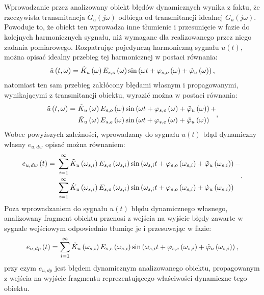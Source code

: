 Wprowadzanie przez analizowany obiekt błędów dynamicznych wynika z faktu, że rzeczywista transmitancja $\tilde{G}_{u}(j\omega)$ odbiega od transmitancji idealnej $\dot{G}_{u}(j\omega)$. Powoduje to, że obiekt ten wprowadza inne tłumienie i przesunięcie w fazie do kolejnych harmonicznych sygnału, niż wymagane dla realizowanego przez niego zadania pomiarowego. Rozpatrując pojedynczą harmoniczną sygnału $u(t)$, można opisać idealny przebieg tej harmonicznej w postaci równania:
\begin{equation}
\dot{u} \left(t,\omega\right) = \dot{K}_{u} \left(\omega\right) E_{s,o} \left(\omega\right) \sin \left( \omega t + \varphi_{s,o} \left(\omega\right) + \dot{\varphi}_{u} \left(\omega\right) \right) \label{eq:mid_cont_omega_ideal},
\end{equation}
natomiast ten sam przebieg zakłócony błędami własnym i propagowanymi, wynikającymi z transmitancji obiektu, wyrazić można w postaci równania:
\begin{equation}
\begin{split}
\tilde{u} \left(t,\omega\right) =~
& \tilde{K}_{u} \left(\omega\right) E_{s,o} \left(\omega\right) \sin \left( \omega t + \varphi_{s,o} \left(\omega\right) + \tilde{\varphi}_{u} \left(\omega\right) \right) + \\
& \tilde{K}_{u} \left(\omega\right) E_{s,e} \left(\omega\right) \sin \left( \omega t + \varphi_{s,e} \left(\omega\right) + \tilde{\varphi}_{u} \left(\omega\right) \right)
\end{split}
\label{eq:mid_cont_omega_real},
\end{equation}
Wobec powyższych zależności, wprowadzany do sygnału $u(t)$ błąd dynamiczny własny $e_{u,dw}$ opisać można równaniem:
\begin{equation}
\begin{split}
e_{u,dw} \left(t\right) =~
& \sum _{i = 1} ^{\infty} \tilde{K}_{u} \left(\omega_{s,i}\right) E_{s,o} \left(\omega_{s,i}\right) \sin \left( \omega_{s,i} t + \varphi_{s,o} \left(\omega_{s,i}\right) + \tilde{\varphi}_{u} \left(\omega_{s,i}\right) \right) - \\
& \sum _{i = 1} ^{\infty} \dot{K}_{u} \left(\omega_{s,i}\right) E_{s,o} \left(\omega_{s,i}\right) \sin \left( \omega_{s,i} t + \varphi_{s,o} \left(\omega_{s,i}\right) + \dot{\varphi}_{u} \left(\omega_{s,i}\right) \right)
\end{split}
\label{eq:mid_cont_err_dyn_self}.
\end{equation}
Poza wprowadzaniem do sygnału $u(t)$ błędu dynamicznego własnego, analizowany fragment obiektu przenosi z wejścia na wyjście błędy zawarte w sygnale wejściowym odpowiednio tłumiąc je i przesuwając w fazie:
\begin{equation}
e_{u,dp} \left(t\right) = \sum _{i = 1} ^{\infty} \tilde{K}_{u} \left(\omega_{s,i}\right) E_{s,e} \left(\omega_{s,i}\right) \sin \left( \omega_{s,i} t + \varphi_{s,e} \left(\omega_{s,i}\right) + \tilde{\varphi}_{u} \left(\omega_{s,i}\right) \right) \label{eq:mid_cont_err_dyn_prop},
\end{equation}
przy czym $e_{u,dp}$ jest błędem dynamicznym analizowanego obiektu, propagowanym z wejścia na wyjście fragmentu reprezentującego właściwości dynamiczne tego obiektu.

